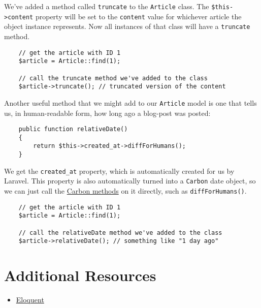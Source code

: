 We've added a method called \texttt{truncate} to the \texttt{Article} class.  The \texttt{\$this->content} property will be set to the \texttt{content} value for whichever article the object instance represents. Now all instances of that class will have a \texttt{truncate} method.

\begin{verbatim}
    // get the article with ID 1
    $article = Article::find(1);

    // call the truncate method we've added to the class
    $article->truncate(); // truncated version of the content
\end{verbatim}

Another useful method that we might add to our \texttt{Article} model is one that tells us, in human-readable form, how long ago a blog-post was posted:

\begin{verbatim}
    public function relativeDate()
    {
        return $this->created_at->diffForHumans();
    }
\end{verbatim}

We get the \texttt{created\_at} property, which is automatically created for us by Laravel. This property is also automatically turned into a \texttt{Carbon} date object, so we can just call the \href{https://carbon.nesbot.com/docs/#api-humandiff}{Carbon methods} on it directly, such as \texttt{diffForHumans()}.

\begin{verbatim}
    // get the article with ID 1
    $article = Article::find(1);

    // call the relativeDate method we've added to the class
    $article->relativeDate(); // something like "1 day ago"
\end{verbatim}



\section{Additional Resources}

\begin{itemize}[leftmargin=*]
    \item \href{http://laravel.com/docs/master/eloquent}{Eloquent}
\end{itemize}
